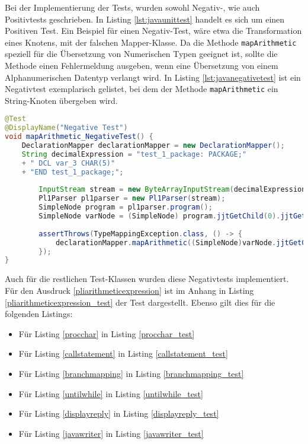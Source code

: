 Bei der Implementierung der Tests, wurden sowohl Negativ-, wie auch Positivtests geschrieben.
In Listing \ref{lst:javaunittest} handelt es sich um einen Positiven Test. 
Ein Beispiel für einen Negativ-Test, wäre etwa die Transformation eines Knotens, mit der falschen Mapper-Klasse.
Da die Methode \verb+mapArithmetic+ speziell für die Übersetzung von Numerischen Typen geeignet ist,
sollte die Methode einen Fehlermeldung ausgeben, wenn eine Übersetzung von einem Alphanumerischen Datentyp verlangt wird.
In Listing \ref{lst:javanegativetest} ist ein Negativtest exemplarisch gelistet, bei dem der Methode \verb+mapArithmetic+
ein String-Knoten übergeben wird.

\begin{lstlisting}[language=Java, caption=Arithmetic Node Unit-test, label={lst:javanegativetest}]
@Test
@DisplayName("Negative Test")
void mapArithmetic_NegativeTest() {
	DeclarationMapper declarationMapper = new DeclarationMapper();
	String decimalExpression = "test_1_package: PACKAGE;" 
	+ "	DCL var_3 CHAR(5)" 
	+ "END test_1_package;";
	
		InputStream stream = new ByteArrayInputStream(decimalExpression.getBytes(StandardCharsets.UTF_8));
		Pl1Parser pl1parser = new Pl1Parser(stream);
		SimpleNode program = pl1parser.program();
		SimpleNode varNode = (SimpleNode) program.jjtGetChild(0).jjtGetChild(1);
		
		assertThrows(TypeMappingException.class, () -> {
			declarationMapper.mapArithmetic((SimpleNode)varNode.jjtGetChild(1).jjtGetChild(0));
		});
}
\end{lstlisting}

Auch für die restlichen Test-Klassen wurden diese Negativtests implementiert. 
Für den Ausdruck \ref{pliarithmeticexpression} ist im Anhang in Listing \ref{pliarithmeticexpression_test} der Test dargestellt. Ebenso gilt dies für die folgenden Listings:

\begin{itemize}
	\item Für Listing \ref{procchar} in Listing \ref{procchar_test}
	\item Für Listing \ref{callstatement} in Listing \ref{callstatement_test}
	\item Für Listing \ref{branchmapping} in Listing \ref{branchmapping_test}
	\item Für Listing \ref{untilwhile} in Listing \ref{untilwhile_test}
	\item Für Listing \ref{displayreply} in Listing \ref{displayreply_test}
	\item Für Listing \ref{javawriter} in Listing \ref{javawriter_test}
\end{itemize}

